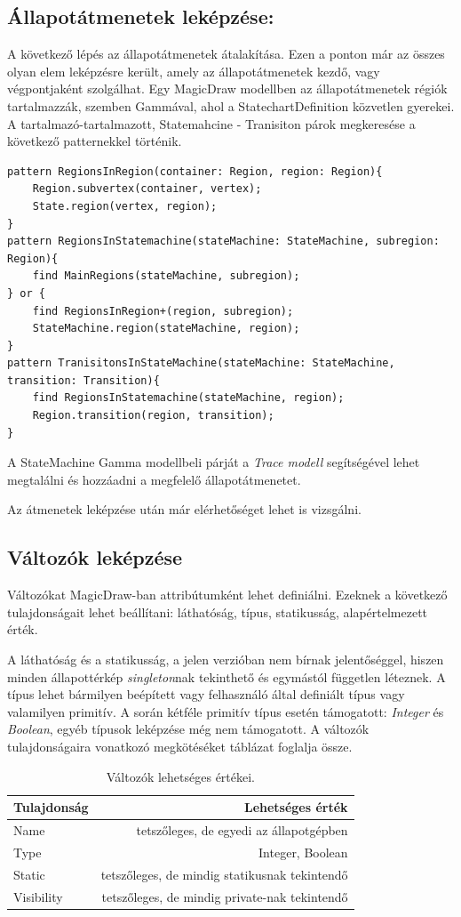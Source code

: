 \subsection{Állapotátmenetek leképzése:} A következő lépés az állapotátmenetek átalakítása. Ezen a ponton már az összes olyan elem leképzésre került, amely az állapotátmenetek kezdő, vagy végpontjaként szolgálhat. Egy MagicDraw modellben az állapotátmenetek régiók tartalmazzák, szemben Gammával, ahol a StatechartDefinition közvetlen gyerekei. A tartalmazó-tartalmazott, Statemahcine - Tranisiton párok megkeresése a következő patternekkel történik.
\lstset{style=VQL}
\begin{lstlisting}
pattern RegionsInRegion(container: Region, region: Region){
	Region.subvertex(container, vertex);
	State.region(vertex, region);
}
pattern RegionsInStatemachine(stateMachine: StateMachine, subregion: Region){
	find MainRegions(stateMachine, subregion);
} or {
	find RegionsInRegion+(region, subregion);
	StateMachine.region(stateMachine, region);
}
pattern TranisitonsInStateMachine(stateMachine: StateMachine, transition: Transition){
	find RegionsInStatemachine(stateMachine, region);
	Region.transition(region, transition);
}
\end{lstlisting}

A StateMachine Gamma modellbeli párját a \emph{Trace modell} segítségével lehet megtalálni és hozzáadni a megfelelő állapotátmenetet.

Az átmenetek leképzése után már elérhetőséget lehet is vizsgálni.

\subsection{Változók leképzése}
Változókat MagicDraw-ban attribútumként lehet definiálni. Ezeknek a következő tulajdonságait lehet beállítani: láthatóság, típus, statikusság, alapértelmezett érték.

A láthatóság és a statikusság, a jelen verzióban nem bírnak jelentőséggel, hiszen minden állapottérkép \emph{singleton}nak tekinthető és egymástól független léteznek. A típus lehet bármilyen beépített vagy felhasználó által definiált típus vagy valamilyen primitív. A során kétféle primitív típus esetén támogatott: \emph{Integer} és \emph{Boolean}, egyéb típusok leképzése még nem támogatott. A változók tulajdonságaira vonatkozó megkötéséket  táblázat foglalja össze.

\begin{table}[!h]
	\footnotesize
	\centering
	\begin{tabular}{ l r }
		Tulajdonság & Lehetséges érték\\ \hline
		Name & tetszőleges, de egyedi az állapotgépben\\
		Type & Integer, Boolean\\
		Static & tetszőleges, de mindig statikusnak tekintendő\\
		Visibility & tetszőleges, de mindig private-nak tekintendő
	\end{tabular}
	\caption{Változók lehetséges értékei.}
	\label{table:variables}
\end{table}



